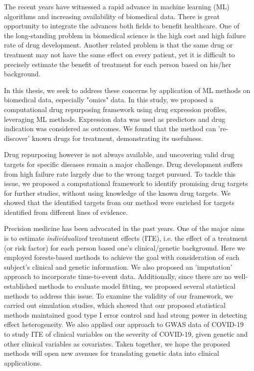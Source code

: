 The recent years have witnessed a rapid advance in machine learning (ML) algorithms and increasing availability of biomedical data. There is great opportunity to integrate the advances both fields to benefit healthcare. One of the long-standing problem in biomedical science is the high cost and high failure rate of drug development. Another related problem is that the same drug or treatment may not have the same effect on every patient, yet it is difficult to precisely estimate the benefit of treatment for each person based on his/her background. 

In this thesis, we seek to address these concerns by application of ML methods on biomedical data, especially "omics" data. In this study, we proposed a computational drug repurposing framework using drug expression profiles, leveraging ML methods. Expression data was used as predictors and drug indication was considered as outcomes. We found that the method can 're-discover' known drugs for treatment, demonstrating its usefulness. 

Drug repurposing however is not always available, and uncovering valid drug targets for specific diseases remain a major challenge. Drug development suffers from high failure rate largely due to the wrong target pursued. To tackle this issue, we proposed a computational framework to identify promising drug targets for further studies, without using knowledge of the known drug targets. We showed that the identified targets from our method were enriched for targets identified from different lines of evidence. 

Precision medicine has been advocated in the past years. One of the major aims is to estimate\textit{ individualized} treatment effects (ITE), i.e. the effect of a treatment (or risk factor) for each person based one's clinical/genetic background. Here we employed forests-based methods to achieve the goal with consideration of each subject's clinical and genetic information. We also proposed an 'imputation' approach to incorporate time-to-event data. Additionally, since there are no well-established methods to evaluate model fitting, we proposed several statistical methods to address this issue. To examine the validity of our framework, we carried out simulation studies, which showed that our proposed statistical methods maintained good type I error control and had strong power in detecting effect heterogeneity. We also applied our approach to GWAS data of COVID-19 to study ITE of clinical variables on the severity of COVID-19, given genetic and other clinical variables as covariates. Taken together, we hope the proposed methods will open new avenues for translating genetic data into clinical applications. 

